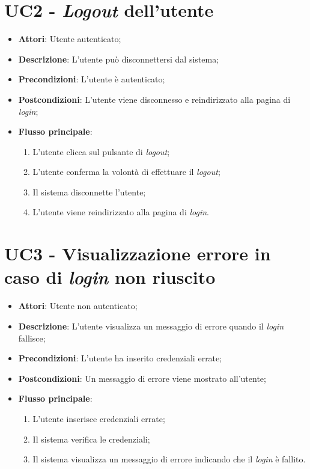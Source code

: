 \section*{UC2 - \textit{Logout} dell'utente}
\begin{itemize}
    \item \textbf{Attori}: Utente autenticato;
    \item \textbf{Descrizione}: L'utente può disconnettersi dal sistema;
    \item \textbf{Precondizioni}: L'utente è autenticato;
    \item \textbf{Postcondizioni}: L'utente viene disconnesso e reindirizzato alla pagina di \textit{login};
    \item \textbf{Flusso principale}:
    \begin{enumerate}
        \item L'utente clicca sul pulsante di \textit{logout};
        \item L'utente conferma la volontà di effettuare il \textit{logout};
        \item Il sistema disconnette l'utente;
        \item L'utente viene reindirizzato alla pagina di \textit{login}.
    \end{enumerate}
\end{itemize}

\vspace{0.5cm}
\section*{UC3 - Visualizzazione errore in caso di \textit{login} non riuscito}
\begin{itemize}
    \item \textbf{Attori}: Utente non autenticato;
    \item \textbf{Descrizione}: L'utente visualizza un messaggio di errore quando il \textit{login} fallisce;
    \item \textbf{Precondizioni}: L'utente ha inserito credenziali errate;
    \item \textbf{Postcondizioni}: Un messaggio di errore viene mostrato all'utente;
    \item \textbf{Flusso principale}:
    \begin{enumerate}
        \item L'utente inserisce credenziali errate;
        \item Il sistema verifica le credenziali;
        \item Il sistema visualizza un messaggio di errore indicando che il \textit{login} è fallito.
    \end{enumerate}
\end{itemize}

